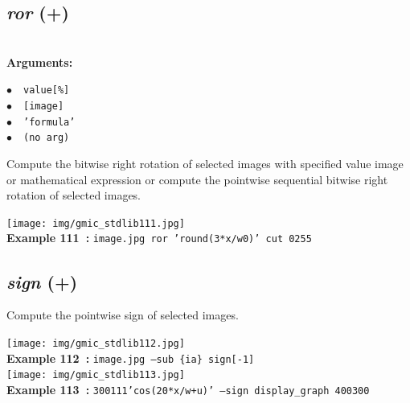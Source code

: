 \documentclass[a4paper,10.5pt,twoside]{book}
\def\comma{\discretionary{,}{}{,}}
\newcommand{\Cb}[1]{\textcolor{cb}{#1}}
\begin{document}
\subsection{\emph{ror} (+)}\vspace*{-0.7em}
~\\\textbf{\Cb{Arguments: }}\begin{flushleft}
{\small \Cb{\hspace*{0.5cm}$\bullet$~~\texttt{value[\%]}}}~~~\\
{\small \Cb{\hspace*{0.5cm}$\bullet$~~\texttt{[image]}}}~~~\\
{\small \Cb{\hspace*{0.5cm}$\bullet$~~\texttt{'formula'}}}~~~\\
{\small \Cb{\hspace*{0.5cm}$\bullet$~~\texttt{(no arg)}}}\end{flushleft}
Compute the bitwise right rotation of selected images with specified value{\comma} image or
mathematical expression{\comma} or compute the pointwise sequential bitwise right rotation of
selected images.
\begin{center}\texttt{[image: img/gmic\_stdlib111.jpg]}\\
{\footnotesize \textbf{Example 111~:} \texttt{image.jpg ror 'round(3*x/w{\comma}0)' cut 0{\comma}255}}
\end{center}

\subsection{\emph{sign} (+)}\vspace*{-0.7em}
Compute the pointwise sign of selected images.
\begin{center}\texttt{[image: img/gmic\_stdlib112.jpg]}\\
{\footnotesize \textbf{Example 112~:} \texttt{image.jpg --sub \{ia\} sign[-1]}}
\\\texttt{[image: img/gmic\_stdlib113.jpg]}\\
{\footnotesize \textbf{Example 113~:} \texttt{300{\comma}1{\comma}1{\comma}1{\comma}'cos(20*x/w+u)' --sign display\_graph 400{\comma}300}}
\end{center}
\end{document}
